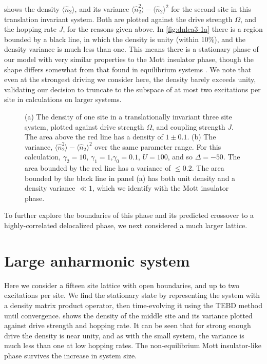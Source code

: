  shows the density \(\langle \hat{n}_{2} \rangle\), and its variance \(\langle \hat{n}_{2}^{2} \rangle - \langle \hat{n}_{2} \rangle^{2}\) for the second site in this translation invariant system. Both are plotted against the drive strength \(\Omega\), and the hopping rate \(J\), for the reasons given above. In \cref{fig:dnlca3-1a} there is a region bounded by a black line, in which the density is unity (within 10\%), and the density variance is much less than one. This means there is a stationary phase of our model with very similar properties to the Mott insulator phase, though the shape differs somewhat from that found in equilibrium systems \cite{Rossini2007}. We note that even at the strongest driving we consider here, the density barely exceeds unity, validating our decision to truncate to the subspace of at most two excitations per site in calculations on larger systems.

\begin{figure}[ht]
	 \hfill
	\caption{\label{fig:dnlca3-1} (a) The density of one site in a translationally invariant three site system, plotted against drive strength \(\Omega\), and coupling strength \(J\). The area above the red line has a density of \(1 \pm 0.1\). (b) The variance, \(\langle \hat{n}_{2}^{2} \rangle - \langle \hat{n}_{2} \rangle^{2}\) over the same parameter range. For this calculation, \(\gamma_{2} = 10\), \(\gamma_{1} = 1\),\(\gamma_{0} = 0.1\), \(U=100\), and so \(\Delta = -50\). The area bounded by the red line has a variance of \(\leq 0.2\). The area bounded by the black line in panel (a) has both unit density and a density variance \(\ll 1\), which we identify with the Mott insulator phase.}
\end{figure}

To further explore the boundaries of this phase and its predicted crossover to a highly-correlated delocalized phase, we next considered a much larger lattice.

\section{Large anharmonic system}

Here we consider a fifteen site lattice with open boundaries, and up to two excitations per site. We find the stationary state by representing the system with a density matrix product operator, then time-evolving it using the TEBD method \cite{Vidal2004} until convergence.  shows the density of the middle site and its variance plotted against drive strength and hopping rate. It can be seen that for strong enough drive the density is near unity, and as with the small system, the variance is much less than one at low hopping rates. The non-equilibrium Mott insulator-like phase survives the increase in system size.

